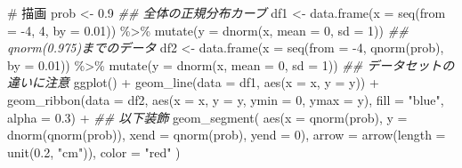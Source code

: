 \documentclass[
  a4paper,
]{book}
\newenvironment{Shaded}{\begin{snugshade}}{\end{snugshade}}
\newcommand{\AttributeTok}[1]{\textcolor[rgb]{0.40,0.45,0.13}{#1}}
\newcommand{\CommentTok}[1]{\textcolor[rgb]{0.37,0.37,0.37}{#1}}
\newcommand{\DecValTok}[1]{\textcolor[rgb]{0.68,0.00,0.00}{#1}}
\newcommand{\DocumentationTok}[1]{\textcolor[rgb]{0.37,0.37,0.37}{\textit{#1}}}
\newcommand{\FloatTok}[1]{\textcolor[rgb]{0.68,0.00,0.00}{#1}}
\newcommand{\FunctionTok}[1]{\textcolor[rgb]{0.28,0.35,0.67}{#1}}
\newcommand{\NormalTok}[1]{\textcolor[rgb]{0.00,0.23,0.31}{#1}}
\newcommand{\OtherTok}[1]{\textcolor[rgb]{0.00,0.23,0.31}{#1}}
\newcommand{\SpecialCharTok}[1]{\textcolor[rgb]{0.37,0.37,0.37}{#1}}
\newcommand{\StringTok}[1]{\textcolor[rgb]{0.13,0.47,0.30}{#1}}
\begin{document}
\begin{Shaded}
\begin{Highlighting}[]
\CommentTok{\# 描画}
\NormalTok{prob }\OtherTok{\textless{}{-}} \FloatTok{0.9}
\DocumentationTok{\#\# 全体の正規分布カーブ}
\NormalTok{df1 }\OtherTok{\textless{}{-}} \FunctionTok{data.frame}\NormalTok{(}\AttributeTok{x =} \FunctionTok{seq}\NormalTok{(}\AttributeTok{from =} \SpecialCharTok{{-}}\DecValTok{4}\NormalTok{, }\DecValTok{4}\NormalTok{, }\AttributeTok{by =} \FloatTok{0.01}\NormalTok{)) }\SpecialCharTok{\%\textgreater{}\%}
  \FunctionTok{mutate}\NormalTok{(}\AttributeTok{y =} \FunctionTok{dnorm}\NormalTok{(x, }\AttributeTok{mean =} \DecValTok{0}\NormalTok{, }\AttributeTok{sd =} \DecValTok{1}\NormalTok{))}
\DocumentationTok{\#\# qnorm(0.975)までのデータ}
\NormalTok{df2 }\OtherTok{\textless{}{-}} \FunctionTok{data.frame}\NormalTok{(}\AttributeTok{x =} \FunctionTok{seq}\NormalTok{(}\AttributeTok{from =} \SpecialCharTok{{-}}\DecValTok{4}\NormalTok{, }\FunctionTok{qnorm}\NormalTok{(prob), }\AttributeTok{by =} \FloatTok{0.01}\NormalTok{)) }\SpecialCharTok{\%\textgreater{}\%}
  \FunctionTok{mutate}\NormalTok{(}\AttributeTok{y =} \FunctionTok{dnorm}\NormalTok{(x, }\AttributeTok{mean =} \DecValTok{0}\NormalTok{, }\AttributeTok{sd =} \DecValTok{1}\NormalTok{))}
\DocumentationTok{\#\# データセットの違いに注意}
\FunctionTok{ggplot}\NormalTok{() }\SpecialCharTok{+}
  \FunctionTok{geom\_line}\NormalTok{(}\AttributeTok{data =}\NormalTok{ df1, }\FunctionTok{aes}\NormalTok{(}\AttributeTok{x =}\NormalTok{ x, }\AttributeTok{y =}\NormalTok{ y)) }\SpecialCharTok{+}
  \FunctionTok{geom\_ribbon}\NormalTok{(}\AttributeTok{data =}\NormalTok{ df2, }\FunctionTok{aes}\NormalTok{(}\AttributeTok{x =}\NormalTok{ x, }\AttributeTok{y =}\NormalTok{ y, }\AttributeTok{ymin =} \DecValTok{0}\NormalTok{, }\AttributeTok{ymax =}\NormalTok{ y), }\AttributeTok{fill =} \StringTok{"blue"}\NormalTok{, }\AttributeTok{alpha =} \FloatTok{0.3}\NormalTok{) }\SpecialCharTok{+}
  \DocumentationTok{\#\# 以下装飾}
  \FunctionTok{geom\_segment}\NormalTok{(}
    \FunctionTok{aes}\NormalTok{(}\AttributeTok{x =} \FunctionTok{qnorm}\NormalTok{(prob), }\AttributeTok{y =} \FunctionTok{dnorm}\NormalTok{(}\FunctionTok{qnorm}\NormalTok{(prob)), }\AttributeTok{xend =} \FunctionTok{qnorm}\NormalTok{(prob), }\AttributeTok{yend =} \DecValTok{0}\NormalTok{),}
    \AttributeTok{arrow =} \FunctionTok{arrow}\NormalTok{(}\AttributeTok{length =} \FunctionTok{unit}\NormalTok{(}\FloatTok{0.2}\NormalTok{, }\StringTok{"cm"}\NormalTok{)), }\AttributeTok{color =} \StringTok{"red"}
\NormalTok{  )}
\end{Highlighting}
\end{Shaded}
\end{document}
